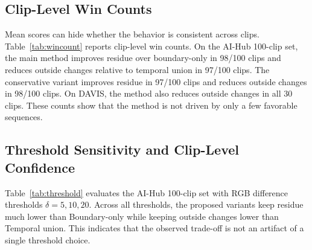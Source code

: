 \documentclass[nouppercase]{kaia}
\begin{document}
\subsection{Clip-Level Win Counts}
Mean scores can hide whether the behavior is consistent across clips. Table~\ref{tab:wincount} reports clip-level win counts. On the AI-Hub 100-clip set, the main method improves residue over boundary-only in 98/100 clips and reduces outside changes relative to temporal union in 97/100 clips. The conservative variant improves residue in 97/100 clips and reduces outside changes in 98/100 clips. On DAVIS, the method also reduces outside changes in all 30 clips. These counts show that the method is not driven by only a few favorable sequences.

\begin{table}[h]
\begin{center}
\end{center}
\caption{Clip-level win counts. ``Gap'' counts clips where the residue gap against temporal union is larger than 0.10, which indicates a limitation of selective expansion.}
\label{tab:wincount}
\end{table}

\subsection{Threshold Sensitivity and Clip-Level Confidence}
Table~\ref{tab:threshold} evaluates the AI-Hub 100-clip set with RGB difference thresholds $\delta=5,10,20$. Across all thresholds, the proposed variants keep residue much lower than Boundary-only while keeping outside changes lower than Temporal union. This indicates that the observed trade-off is not an artifact of a single threshold choice.
\end{document}
